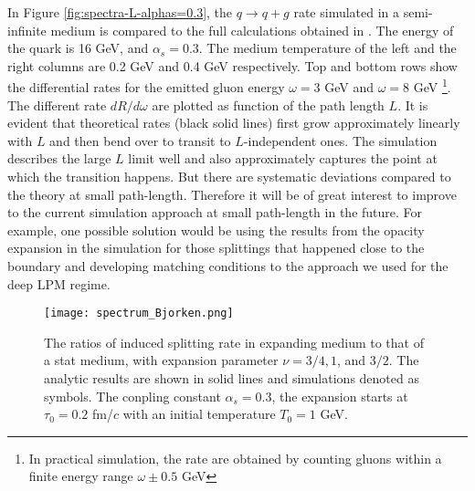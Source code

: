 In Figure \ref{fig:spectra-L-alphas=0.3}, the $q\rightarrow q+g$ rate simulated in a semi-infinite medium is compared to the full calculations obtained in \cite{CaronHuot:2010bp}.
The energy of the quark is 16 GeV, and $\alpha_s = 0.3$.
The medium temperature of the left and the right columns are 0.2 GeV and 0.4 GeV respectively.
Top and bottom rows show the differential rates for the emitted gluon  energy $\omega = 3$ GeV and $\omega = 8$ GeV \footnote{In practical simulation, the rate are obtained by counting gluons within a finite energy range $\omega\pm 0.5$ GeV}.
The different rate $dR/d\omega$ are plotted as function of the path length $L$.
It is evident that theoretical rates (black solid lines) first grow approximately linearly with $L$ and then bend over to transit to $L$-independent ones.
The simulation describes the large $L$ limit well and also approximately captures the point at which the transition happens.
But there are systematic deviations compared to the theory at small path-length.
Therefore it will be of great interest to improve to the current simulation approach at small path-length in the future. 
For example, one possible solution would be using the results from the opacity expansion in the simulation for those splittings that happened close to the boundary and developing matching conditions to the approach we used for the deep LPM regime.

\begin{figure}
\texttt{[image: spectrum\_Bjorken.png]}
\caption{The ratios of induced splitting rate in expanding medium to that of a stat medium, with expansion parameter $\nu = 3/4, 1$, and $3/2$. The analytic results are shown in solid lines and simulations denoted as symbols. The conpling constant $\alpha_s=0.3$, the expansion starts at $\tau_0 = 0.2$ fm/$c$ with an initial temperature $T_0 = 1$ GeV.}
\label{fig:Bjorken-BDMPS}
\end{figure}

